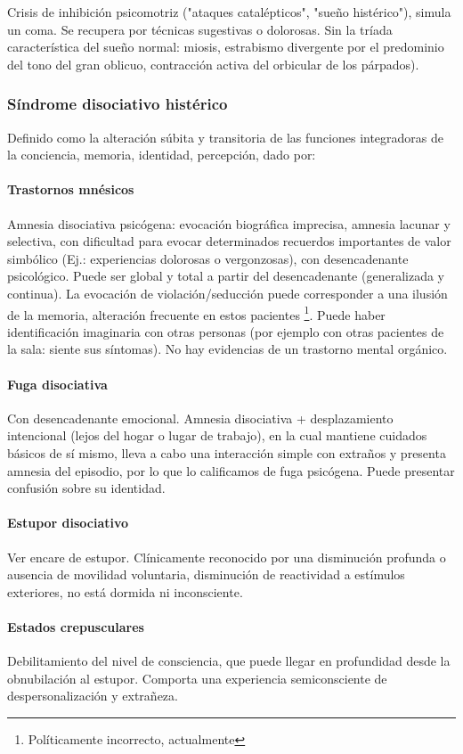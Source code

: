\documentclass{scrbook}
\begin{document}
\faNotesMedical Crisis de inhibición psicomotriz ("ataques catalépticos", "sueño histérico"), simula un coma. Se recupera por técnicas sugestivas o dolorosas. Sin la tríada característica del sueño normal: miosis, estrabismo divergente por el predominio del tono del gran oblicuo, contracción activa del orbicular de los párpados).
\subsubsection*{Síndrome disociativo histérico}
Definido como la alteración súbita y transitoria de las funciones integradoras de la conciencia, memoria, identidad, percepción, dado por:
\paragraph{Trastornos mnésicos}
Amnesia disociativa psicógena: evocación biográfica imprecisa, amnesia lacunar y selectiva, con dificultad para evocar determinados recuerdos importantes de valor simbólico (Ej.: experiencias dolorosas o vergonzosas), con desencadenante psicológico. Puede ser global y total a partir del desencadenante (generalizada y continua). La evocación de violación/seducción puede corresponder a una ilusión de la memoria, alteración frecuente en estos pacientes \footnote{Políticamente incorrecto, actualmente}. Puede haber identificación imaginaria con otras personas (por ejemplo con otras pacientes de la sala: siente sus síntomas). No hay evidencias de un trastorno mental orgánico.
\paragraph{Fuga disociativa}
Con desencadenante emocional. Amnesia disociativa + desplazamiento intencional (lejos del hogar o lugar de trabajo), en la cual mantiene cuidados básicos de sí mismo, lleva a cabo una interacción simple con extraños y presenta amnesia del episodio, por lo que lo calificamos de fuga psicógena. Puede presentar confusión sobre su identidad.
\paragraph{Estupor disociativo}
Ver encare de estupor. Clínicamente reconocido por una disminución profunda o ausencia de movilidad voluntaria, disminución de reactividad a estímulos exteriores, no está dormida ni inconsciente.
\paragraph{Estados crepusculares}
Debilitamiento del nivel de consciencia, que puede llegar en profundidad desde la obnubilación al estupor. Comporta una experiencia semiconsciente de despersonalización y extrañeza.
\end{document}
